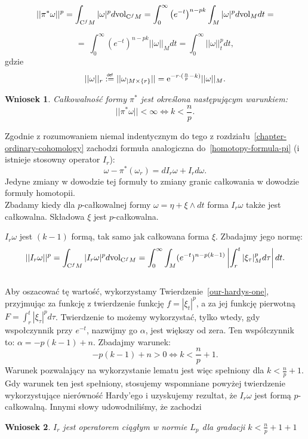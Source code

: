 \documentclass[licencjacka]{pracamgr}
\theoremstyle{definition}
\theoremstyle{definition}
\theoremstyle{plain}
\theoremstyle{plain}
\theoremstyle{plain}
\theoremstyle{plain}
\newtheorem{wniosek}{Wniosek}[section]
\def\cfm{\ensuremath\mathrm{C}^fM}
\def\M{\ensuremath M}
\newcommand\deff{\mathrel{\overset{\makebox[0pt]{\mbox{\normalfont\tiny\sffamily def}}}{:=}}}
\begin{document}
\[
    ||\pi^\ast \omega ||^p = \int_{\cfm} |\omega |^p d \mathrm{vol}_{\cfm} =
    \int_0^\infty \left( e^{-t} \right)^{n-pk} \int_M |\omega|^p d
    \mathrm{vol}_M dt = 
\]

\[
    = \
    \int_0^\infty \left( e^{-t} \right)^{n-pk} || \omega ||_{M} dt = 
    \int_0^\infty || \omega ||_t^p dt,
\] 
gdzie
\[
|| \omega ||_r \deff || \omega_{|M \times \{r\} } || =
\mathrm{e}^{-r \cdot (\frac{n}{p} - k) }  ||\omega ||_{\M}.
\] 


\begin{wniosek}\label{pi-integrable}
  Całkowalność formy $\pi^\ast$ jest określona następującym warunkiem:
  \[
  ||\pi^\ast \omega ||  < \infty  \iff  k < \frac{n}{p}.
  \]
\end{wniosek}


Zgodnie z rozumowaniem niemal indentycznym do tego  z
rozdziału~\ref{chapter-ordinary-cohomology} zachodzi formuła analogiczna
do~\ref{homotopy-formula-pi} (i istnieje stosowny operator $I_r$):
\[
    \omega - \pi^\ast(\omega_r) = dI_r \omega + I_r d\omega.
\]
Jedyne zmiany w dowodzie tej formuły to zmiany granic całkowania w dowodzie
formuły homotopii. \\

Zbadamy kiedy dla $p$-całkowalnej formy $\omega = \eta + \xi \wedge dt$ forma
$I_r \omega$ także jest całkowalna. Składowa $\xi$ jest $p$-całkowalna.

$I_r \omega$ jest $(k-1)$ formą, tak samo jak całkowana forma $\xi$.  Zbadajmy jego normę:
\[
    ||I_r \omega ||^p = 
    \int_{\cfm} |I_r \omega|^p  d\text{vol}_{\cfm} =
    \int_0^\infty \int_{\M} 
        (e^{-t})^{n-p(k-1)}
      \left| \int_r^t |\xi_{\tau} |^p_{\M} d\tau \right| dt.
\] \\

Aby oszacować tę wartość, wykorzystamy Twierdzenie~\ref{our-hardys-one},
przyjmując za funkcję z twierdzenie funkcję $f = |\xi_{t} |^p$, a za jej
funkcję pierwotną $F = \int_r^t |\xi_{\tau}|^p d \tau $.  Twierdzenie to możemy
wykorzystać, tylko wtedy, gdy wspołczynnik przy $e^{-t}$, nazwijmy go $\alpha$,
jest większy od zera. Ten współczynnik to: $\alpha = -p(k-1) + n$. Zbadajmy
warunek:
\[
    -p(k-1) + n > 0 \iff k < \frac{n}{p} + 1.
\]
Warunek pozwalający na wykorzystanie lematu jest więc spełniony dla $k <
\frac{n}{p} + 1$.  Gdy warunek ten jest spełniony, stosujemy wspomniane powyżej
twierdzenie wykorzystujące nierówność Hardy'ego i uzyskujemy rezultat, że $I_r
\omega$ jest formą $p$-całkowalną. Innymi słowy udowodniliśmy, że zachodzi
\begin{wniosek}
$I_r$ jest operatorem ciągłym w normie $L_p$ dla gradacji $k < \frac{n}{p} + 1 + 1$
\end{wniosek}
\end{document}
